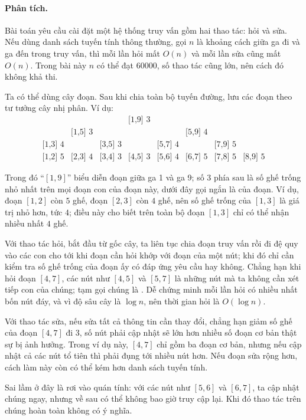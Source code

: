 \documentclass[11pt]{article}
\begin{document}
\paragraph{Phân tích.}
Bài toán yêu cầu cài đặt một hệ thống truy vấn gồm hai thao tác: hỏi và sửa.
Nếu dùng danh sách tuyến tính thông thường, gọi $n$ là khoảng cách giữa ga đi
và ga đến trong truy vấn, thì mỗi lần hỏi mất $O(n)$ và mỗi lần sửa cũng mất
$O(n)$. Trong bài này $n$ có thể đạt $60000$, số thao tác cũng lớn, nên cách
đó không khả thi.

Ta có thể dùng cây đoạn. Sau khi chia toàn bộ tuyến đường, lưu các đoạn theo
tư tưởng cây nhị phân. Ví dụ:
\[
\begin{array}{cccccccc}
&&&\text{[1,9] 3}&&&&\\
&\text{[1,5] 3}&&&&\text{[5,9] 4}&&\\
\text{[1,3] 4}&&\text{[3,5] 3}&&\text{[5,7] 4}&&\text{[7,9] 5}&\\
\text{[1,2] 5}&\text{[2,3] 4}&\text{[3,4] 3}&\text{[4,5] 3}&
\text{[5,6] 4}&\text{[6,7] 5}&\text{[7,8] 5}&\text{[8,9] 5}
\end{array}
\]

Trong đó ``$[1,9]$'' biểu diễn đoạn giữa ga 1 và ga 9; số $3$ phía sau là số
ghế trống nhỏ nhất trên mọi đoạn con của đoạn này, dưới đây gọi ngắn là
 của đoạn. Ví dụ, đoạn $[1,2]$ còn $5$ ghế, đoạn $[2,3]$
còn $4$ ghế, nên số ghế trống của $[1,3]$ là giá trị nhỏ hơn, tức $4$; điều
này cho biết trên toàn bộ đoạn $[1,3]$ chỉ có thể nhận nhiều nhất $4$ ghế.

Với thao tác hỏi, bắt đầu từ gốc cây, ta liên tục chia đoạn truy vấn rồi đi
đệ quy vào các con cho tới khi đoạn cần hỏi khớp với đoạn của một nút; khi đó
chỉ cần kiểm tra số ghế trống của đoạn ấy có đáp ứng yêu cầu hay không. Chẳng
hạn khi hỏi đoạn $[4,7]$, các nút như $[4,5]$ và $[5,7]$ là những nút mà ta
không cần xét tiếp con của chúng; tạm gọi chúng là . Dễ chứng
minh mỗi lần hỏi có nhiều nhất bốn nút đáy, và vì độ sâu cây là $\log n$, nên
thời gian hỏi là $O(\log n)$.

Với thao tác sửa, nếu sửa tất cả thông tin cần thay đổi, chẳng hạn giảm số
ghế của đoạn $[4,7]$ đi $3$, số nút phải cập nhật sẽ lớn hơn nhiều số đoạn cơ
bản thật sự bị ảnh hưởng. Trong ví dụ này, $[4,7]$ chỉ gồm ba đoạn cơ bản,
nhưng nếu cập nhật cả các nút tổ tiên thì phải đụng tới nhiều nút hơn. Nếu
đoạn sửa rộng hơn, cách làm này còn có thể kém hơn danh sách tuyến tính.

Sai lầm ở đây là rơi vào quán tính: với các nút như $[5,6]$ và $[6,7]$, ta
cập nhật chúng ngay, nhưng về sau có thể không bao giờ truy cập lại. Khi đó
thao tác trên chúng hoàn toàn không có ý nghĩa.
\end{document}
